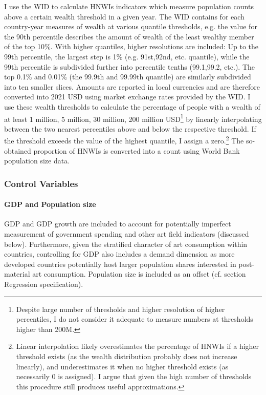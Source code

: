 \documentclass[11pt]{article}
\begin{document}
I use the WID to calculate HNWIs indicators which measure population counts above a certain wealth threshold in a given year. 
The WID contains for each country-year measures of wealth at various quantile thresholds, e.g. the value for the 90th percentile describes the amount of wealth of the least wealthy member of the top 10\%.
With higher quantiles, higher resolutions are included: Up to the 99th percentile, the largest step is 1\% (e.g. 91st,92nd, etc. quantile), while the 99th percentile is subdivided further into percentile tenths (99.1,99.2, etc.).
The top 0.1\% and 0.01\% (the 99.9th and 99.99th quantile) are similarly subdivided into ten smaller slices.
Amounts are reported in local currencies and are therefore converted into 2021 USD using market exchange rates provided by the WID.
I use these wealth thresholds to calculate the percentage of people with a wealth of at least 1 million, 5 million, 30 million, 200 million USD\footnote{Despite large number of thresholds and higher resolution of higher percentiles, I do not consider it adequate to measure numbers at thresholds higher than 200M.} by linearly interpolating between the two nearest percentiles above and below the respective threshold.
If the threshold exceeds the value of the highest quantile, I assign a zero.\footnote{Linear interpolation likely overestimates the percentage of HNWIs if a higher threshold exists (as the wealth distribution probably does not increase linearly), and underestimates it when no higher threshold exists (as necessarily 0 is assigned). I argue that given the high number of thresholds this procedure still produces useful approximations.}
The so-obtained proportion of HNWIs is converted into a count using World Bank population size data.


\subsubsection*{Control Variables}

\paragraph*{GDP and Population size}

GDP and GDP growth are included to account for potentially imperfect measurement of government spending and other art field indicators (discussed below). 
Furthermore, given the stratified character of art consumption \parencite{Bourdieu_1984_distinction} within countries, controlling for GDP also includes a demand dimension as more developed countries potentially host larger population shares interested in post-material art consumption.
Population size is included as an offset (cf. section Regression specification). 
\end{document}
